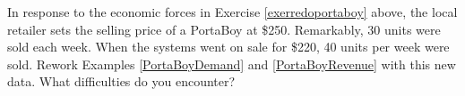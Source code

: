 {In response to the economic forces in Exercise \ref{exerredoportaboy} above, the local retailer sets the selling price of a PortaBoy at \$250.  Remarkably, 30 units were sold each week.  When the systems went on sale for \$220, 40 units per week were sold.  Rework Examples \ref{PortaBoyDemand} and \ref{PortaBoyRevenue} with this new data.  What difficulties do you encounter?}
{
}